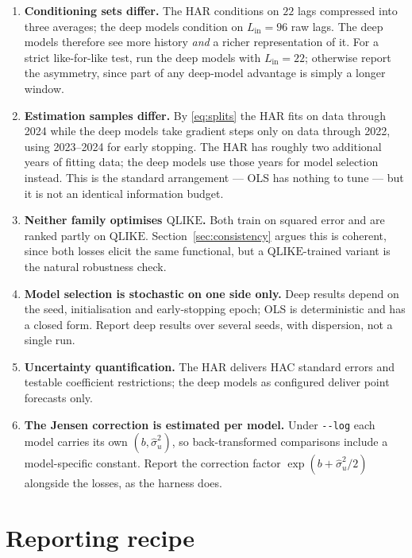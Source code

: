 \documentclass[11pt,a4paper]{article}
\newcommand{\QLIKE}{\mathrm{QLIKE}}
\newcommand{\Lin}{L_{\mathrm{in}}}
\begin{document}
\begin{enumerate}
  \item \textbf{Conditioning sets differ.} The HAR conditions on $22$ lags compressed into
        three averages; the deep models condition on $\Lin=96$ raw lags. The deep models
        therefore see more history \emph{and} a richer representation of it. For a strict
        like-for-like test, run the deep models with $\Lin=22$; otherwise report the
        asymmetry, since part of any deep-model advantage is simply a longer window.
  \item \textbf{Estimation samples differ.} By \eqref{eq:splits} the HAR fits on data
        through 2024 while the deep models take gradient steps only on data through 2022,
        using 2023--2024 for early stopping. The HAR has roughly two additional years of
        fitting data; the deep models use those years for model selection instead. This is
        the standard arrangement --- OLS has nothing to tune --- but it is not an identical
        information budget.
  \item \textbf{Neither family optimises $\QLIKE$.} Both train on squared error and are
        ranked partly on $\QLIKE$. Section~\ref{sec:consistency} argues this is coherent,
        since both losses elicit the same functional, but a $\QLIKE$-trained variant is the
        natural robustness check.
  \item \textbf{Model selection is stochastic on one side only.} Deep results depend on the
        seed, initialisation and early-stopping epoch; OLS is deterministic and has a closed
        form. Report deep results over several seeds, with dispersion, not a single run.
  \item \textbf{Uncertainty quantification.} The HAR delivers HAC standard errors and
        testable coefficient restrictions; the deep models as configured deliver point
        forecasts only.
  \item \textbf{The Jensen correction is estimated per model.} Under \texttt{-{}-log} each
        model carries its own $(b,\hat\sigma_u^2)$, so back-transformed comparisons include
        a model-specific constant. Report the correction factor $\exp(b+\hat\sigma_u^2/2)$
        alongside the losses, as the harness does.
\end{enumerate}

\section{Reporting recipe}
\label{sec:recipe}
\end{document}
